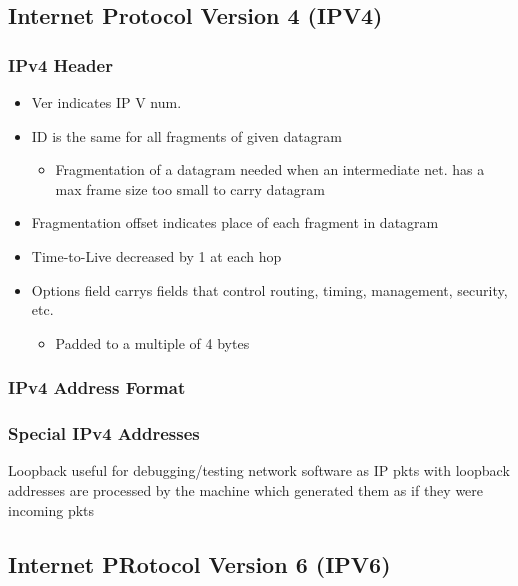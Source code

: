 \subsection{Internet Protocol Version 4 (IPV4)}
\subsubsection{IPv4 Header}
\begin{itemize}
	\item Ver indicates IP V num.
	\item ID is the same for all fragments of given datagram
	\begin{itemize}
		\item Fragmentation of a datagram needed when an intermediate
			net. has a max frame size too small to carry datagram
	\end{itemize}
	\item Fragmentation offset indicates place of each fragment in datagram
	\item Time-to-Live decreased by 1 at each hop
	\item Options field carrys fields that control routing, timing,
		management, security, etc.
	\begin{itemize}
		\item Padded to a multiple of 4 bytes
	\end{itemize}
\end{itemize}
\subsubsection{IPv4 Address Format}
\subsubsection{Special IPv4 Addresses}
Loopback useful for debugging/testing network software as IP pkts with loopback
addresses are processed by the machine which generated them as if they were
incoming pkts
\subsection{Internet PRotocol Version 6 (IPV6)}
